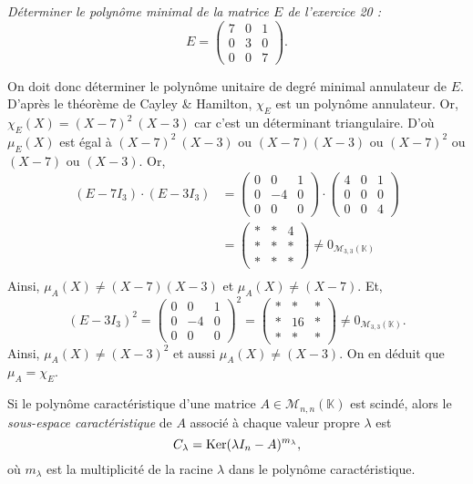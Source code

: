 \begin{exo}
	{\slshape Déterminer le polynôme minimal de la matrice $E$\/ de l'exercice 20 : \[
		E = \begin{pmatrix}
			7&0&1\\
			0&3&0\\
			0&0&7
		\end{pmatrix}
	.\]}

	On doit donc déterminer le polynôme unitaire de degré minimal annulateur de $E$.
	D'après le théorème de {\sc Cayley \& Hamilton}, $\chi_E$\/ est un polynôme annulateur. Or, $\chi_E(X) = (X-7)^2\:(X-3)$\/ car c'est un déterminant triangulaire.
	D'où $\mu_E(X)$\/ est égal à $(X-7)^2\:(X-3)$\/ ou $(X-7)(X-3)$\/ ou $(X-7)^2$\/ ou $(X-7)$\/ ou $(X-3)$.
	Or,
	\begin{align*}
		(E-7I_3)\cdot (E-3I_3) &= \begin{pmatrix}
			0&0&1\\
			0&-4&0\\
			0&0&0
		\end{pmatrix}\cdot \begin{pmatrix}
			4&0&1\\
			0&0&0\\
			0&0&4
		\end{pmatrix} \\
		&= \begin{pmatrix}
			*&*&4\\
			*&*&*\\
			*&*&*
		\end{pmatrix} \neq 0_{\mathscr{M}_{3,3}(\mathds{K})} \\
	\end{align*}
	Ainsi, $\mu_A(X) \neq (X-7)(X-3)$\/ et $\mu_A(X) \neq (X-7)$.
	Et,
	\[
		(E-3I_3)^2 = \begin{pmatrix}
			0&0&1\\
			0&-4&0\\
			0&0&0
		\end{pmatrix}^2 = \begin{pmatrix}
			*&*&*\\
			*&16&*\\
			*&*&*
		\end{pmatrix} \neq 0_{\mathscr{M}_{3,3}(\mathds{K})}
	.\]
	Ainsi, $\mu_A(X) \neq (X-3)^2$\/ et aussi $\mu_A(X) \neq (X-3)$. On en déduit que $\mu_A = \chi_E$.
\end{exo}

\begin{defn}
	Si le polynôme caractéristique d'une matrice $A \in \mathscr{M}_{n,n}(\mathds{K})$\/ est scindé, alors le {\it sous-espace caractéristique}\/ de $A$\/ associé à chaque valeur propre $\lambda$\/ est \[
		C_\lambda = \operatorname{Ker}(\lambda I_n - A)^{m_\lambda},
	\] où $m_\lambda$\/ est la multiplicité de la racine $\lambda$\/ dans le polynôme caractéristique.
\end{defn}

